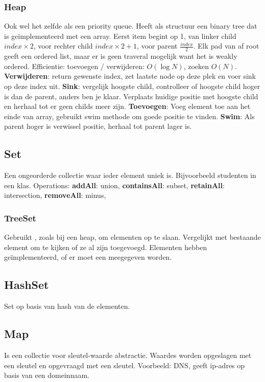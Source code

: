 \subsubsection{Heap}
Ook wel het zelfde als een priority queue.
Heeft als structuur een binary tree dat is geïmplementeerd met een array.
Eerst item begint op 1, van linker child $index \times 2$, voor rechter child $index \times 2 + 1$, voor parent $\frac{index}{2}$.
Elk pad van af root geeft een ordered list, maar er is geen traveral mogelijk want het is weakly ordered.
Efficientie: toevoegen / verwijderen: $O(\log N)$, zoeken $O(N)$.
\textbf{Verwijderen}: return gewenste index, zet laatste node op deze plek en voer sink op deze index uit.
\textbf{Sink}: vergelijk hoogste child, controlleer of hoogste child hoger is dan de parent, anders ben je klaar.
Verplaats huidige positie met hoogste child en herhaal tot er geen childs meer zijn.
\textbf{Toevoegen}: Voeg element toe aan het einde van array, gebruikt swim methode om goede positie te vinden.
\textbf{Swim}: Als parent hoger is verwissel positie, herhaal tot parent lager is.

\subsection{Set}
Een ongeorderde collectie waar ieder element uniek is.
Bijvoorbeeld studenten in een klas.
Operations:
\textbf{addAll}: union,
\textbf{containsAll}: subset,
\textbf{retainAll}: intersection,
\textbf{removeAll}: minus,

\subsubsection{TreeSet}
Gebruikt , zoals bij een heap, om elementen op te slaan.
Vergelijkt met bestaande element om te kijken of ze al zijn toegevoegd.
Elementen hebben  geïmplementeerd, of er moet een  meegegeven worden.

\subsection{HashSet}
Set op basis van hash van de elementen. 

\subsection{Map}
Is een collectie voor sleutel-waarde abstractie.
Waardes worden opgeslagen met een sleutel en opgevraagd met een sleutel.
Voorbeeld: DNS, geeft ip-adres op basis van een domeinnaam.

